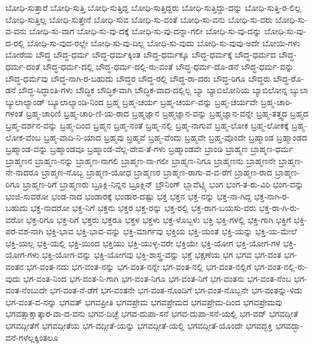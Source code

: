 {ಬೋಧಿ-ಸುತ್ತಾರೆ
ಬೋಧಿ-ಸುತ್ತಿ
ಬೋಧಿ-ಸುತ್ತಿದ್ದ
ಬೋಧಿ-ಸುತ್ತಿದ್ದರು
ಬೋಧಿ-ಸುತ್ತಿದ್ದು-ದನ್ನು
ಬೋಧಿ-ಸುತ್ತಿ-ರ-ಲಿಲ್ಲ
ಬೋಧಿ-ಸುತ್ತಿಲ್ಲ
ಬೋಧಿ-ಸುತ್ತೇನೆ
ಬೋಧಿ-ಸುವ
ಬೋಧಿ-ಸು-ವಂತೆ
ಬೋಧಿ-ಸು-ವನು
ಬೋಧಿ-ಸು-ವರು
ಬೋಧಿ-ಸು-ವ-ವನು
ಬೋಧಿ-ಸು-ವಾಗ
ಬೋಧಿ-ಸು-ವು-ದಕ್ಕೆ
ಬೋಧಿ-ಸು-ವು-ದನ್ನಾ-ಗಲೀ
ಬೋಧಿ-ಸು-ವು-ದನ್ನು
ಬೋಧಿ-ಸು-ವು-ದ-ರಲ್ಲಿ
ಬೋಧಿ-ಸು-ವುದ-ರಲ್ಲೇ
ಬೋಧಿ-ಸು-ವು-ದಿಲ್ಲ
ಬೋಧಿ-ಸು-ವುದು
ಬೋಧಿ-ಸು-ವುವು-ಅದೇ
ಬೋಯಿ-ಗಳು
ಬೋರೆಯ
ಬೌದ್ಧ
ಬೌದ್ಧ-ಧರ್ಮ
ಬೌದ್ಧ-ಧರ್ಮಕ್ಕಿಂತ
ಬೌದ್ಧ-ಧರ್ಮಕ್ಕೂ
ಬೌದ್ಧ-ಧರ್ಮಕ್ಕೆ
ಬೌದ್ಧ-ಧರ್ಮದ
ಬೌದ್ಧ-ಧರ್ಮ-ದಂತೆ
ಬೌದ್ಧ-ಧರ್ಮ-ದಲ್ಲಿ
ಬೌದ್ಧ-ಧರ್ಮ-ದಲ್ಲಿ-ರು-ವಂತೆ
ಬೌದ್ಧ-ಧರ್ಮ-ದೊ-ಡನೆ
ಬೌದ್ಧ-ಧರ್ಮ-ವನ್ನು
ಬೌದ್ಧ-ಧರ್ಮವು
ಬೌದ್ಧ-ನಾಗಿ-ರ-ಬಹುದು
ಬೌದ್ಧರ
ಬೌದ್ಧ-ರಲ್ಲಿ
ಬೌದ್ಧ-ರಾ-ದರು
ಬೌದ್ಧ-ರಿಗೂ
ಬೌದ್ಧರು
ಬೌದ್ಧ-ರೊ-ಡನೆ
ಬೌದ್ಧ-ಸಿದ್ಧಾಂತಿ-ಗಳು
ಬೌದ್ಧಿಕ
ಬೌದ್ಧಿಕ-ವಾಗಿ
ಬೌದ್ಧಿಕ-ವಾದ-ದಲ್ಲಿಲ್ಲ
ಬ್ಯಾ
ಬ್ಯಾಬಿಲೋನಿಯ
ಬ್ಯಾಬಿಲೋನ್ನ
ಬ್ಯುಲಾ
ಬ್ಯುಲಾಲ್ಯಾಂಡ್
ಬ್ಯೂಲಾಲ್ಯಾಂಡಿ-ನಿಂದ
ಬ್ರಹ್ಮ
ಬ್ರಹ್ಮ-ಚರ್ಯ
ಬ್ರಹ್ಮ-ಚರ್ಯ-ವನ್ನು
ಬ್ರಹ್ಮ-ಚರ್ಯವೇ
ಬ್ರಹ್ಮ-ಚಾರಿ-ಗಳಂತೆ
ಬ್ರಹ್ಮ-ಚಾರಿಣಿ
ಬ್ರಹ್ಮ-ಚಾರಿ-ಣಿ-ಯ-ರಾದ
ಬ್ರಹ್ಮಜ್ಞಾನ
ಬ್ರಹ್ಮಜ್ಞಾನ-ವನ್ನು
ಬ್ರಹ್ಮಜ್ಞಾನ-ವನ್ನೇ
ಬ್ರಹ್ಮ-ತತ್ತ್ವದ
ಬ್ರಹ್ಮದ
ಬ್ರಹ್ಮ-ದರ್ಶನ-ವನ್ನು
ಬ್ರಹ್ಮ-ದಿಂದ
ಬ್ರಹ್ಮನ
ಬ್ರಹ್ಮ-ನಂತೆ
ಬ್ರಹ್ಮ-ನಲ್ಲಿ
ಬ್ರಹ್ಮ-ನಾಗುವೆ
ಬ್ರಹ್ಮ-ಲೋಕ
ಬ್ರಹ್ಮ-ಲೋಕಕ್ಕೆ
ಬ್ರಹ್ಮ-ಲೋಕ-ವೆಂಬ
ಬ್ರಹ್ಮ-ವಾದಿ-ನಿ-ಯಾದ
ಬ್ರಹ್ಮವು
ಬ್ರಹ್ಮವೆ
ಬ್ರಹ್ಮ-ವೆಂದು
ಬ್ರಹ್ಮವೇ
ಬ್ರಹ್ಮ-ವೊಂದೇ
ಬ್ರಹ್ಮಾಂಡ
ಬ್ರಹ್ಮಾಂಡದ
ಬ್ರಹ್ಮಾಂಡ-ವನ್ನು
ಬ್ರಹ್ಮಾಂಡವೂ
ಬ್ರಹ್ಮಾಂಡ-ವೆಲ್ಲ-ದೇವ-ತೆ-ಗಳು
ಬ್ರಹ್ಮಾಂಡವೇ
ಬ್ರಾಂಡಿ
ಬ್ರಾಹ್ಮಣ
ಬ್ರಾಹ್ಮಣ-ಧರ್ಮ
ಬ್ರಾಹ್ಮಣನ
ಬ್ರಾಹ್ಮಣ-ನನ್ನು
ಬ್ರಾಹ್ಮಣ-ನಾಗಲಿ
ಬ್ರಾಹ್ಮಣ-ನಾ-ಗಲೀ
ಬ್ರಾಹ್ಮಣ-ನಿಗೂ
ಬ್ರಾಹ್ಮಣನು
ಬ್ರಾಹ್ಮಣನೇ
ಬ್ರಾಹ್ಮಣ-ನೇ-ನಾದರೂ
ಬ್ರಾಹ್ಮಣ-ನೊಬ್ಬ
ಬ್ರಾಹ್ಮಣ-ಯೋಧ
ಬ್ರಾಹ್ಮಣರ
ಬ್ರಾಹ್ಮಣ-ರಾಗು-ವ-ವ-ರೆಗೆ
ಬ್ರಾಹ್ಮಣ-ರಾದ
ಬ್ರಾಹ್ಮಣ-ರಿಗೂ
ಬ್ರಾಹ್ಮಣ-ರಿಗೆ
ಬ್ರಾಹ್ಮಣರು
ಬ್ರೂಕ್ಲಿ-ನಿನ್ನನ
ಬ್ರೂಕ್ಲಿನ್
ಬ್ರೌನಿಂಗ್
ಬ್ಲಾವೆಟ್ಸ್ಕಿ
ಭಂಗ
ಭಂಗ-ತ-ರು-ವಿರಿ
ಭಂಗ-ವನ್ನು
ಭಂಜಿ-ಸುವರೋ
ಭಂಡ-ನಾದ
ಭಂಡಾರಕ್ಕೆ
ಭಂಡಾರ-ದಷ್ಟು
ಭಕ್ತ
ಭಕ್ತನ
ಭಕ್ತ-ನನ್ನು
ಭಕ್ತ-ನಾ-ಗಿದ್ದ
ಭಕ್ತ-ನಾಗಿ-ರ-ಬಹುದು
ಭಕ್ತ-ನಾದರೋ
ಭಕ್ತ-ನಿಗೆ
ಭಕ್ತನು
ಭಕ್ತರ
ಭಕ್ತ-ರನ್ನು
ಭಕ್ತ-ರಲ್ಲಿ
ಭಕ್ತ-ರಾಗ-ಬಯಸು-ವರು
ಭಕ್ತ-ರಾ-ಗಿ-ರು-ವರೋ
ಭಕ್ತ-ರಿಗೂ
ಭಕ್ತ-ರಿಗೆ
ಭಕ್ತರು
ಭಕ್ತರೂ
ಭಕ್ತಳ
ಭಕ್ತಳು
ಭಕ್ತ-ಳೊಬ್ಬಳು
ಭಕ್ತಿ
ಭಕ್ತಿ-ಗಳಲ್ಲಿ
ಭಕ್ತಿ-ಗಾಗಿ
ಭಕ್ತಿಗೆ
ಭಕ್ತಿ-ಪರ-ವಶ-ನಾಗಿ
ಭಕ್ತಿ-ಭಾವ
ಭಕ್ತಿ-ಭಾವ-ವನ್ನು
ಭಕ್ತಿ-ಮಾರ್ಗವು
ಭಕ್ತಿಯ
ಭಕ್ತಿ-ಯಂತೆ
ಭಕ್ತಿ-ಯನ್ನು
ಭಕ್ತಿ-ಯ-ಮೇಲೆ
ಭಕ್ತಿ-ಯಲ್ಲ
ಭಕ್ತಿ-ಯಲ್ಲಿ
ಭಕ್ತಿ-ಯಿಂದ
ಭಕ್ತಿಯು
ಭಕ್ತಿ-ಯುಳ್ಳ-ವರೇ
ಭಕ್ತಿಯೇ
ಭಕ್ತಿ-ಯೋಗ
ಭಕ್ತಿ-ಯೋಗ-ಗಳ
ಭಕ್ತಿ-ಯೋಗ-ಗಳು
ಭಕ್ತಿ-ಯೋಗ-ವನ್ನು
ಭಕ್ತಿ-ಯೋಗವು
ಭಕ್ತಿ-ಶಾಸ್ತ್ರ-ವನ್ನು
ಭಕ್ತೆ
ಭಕ್ಷಣೆಯ
ಭಗ
ಭಗವ
ಭಗ-ವಂತ
ಭಗ-ವಂತನ
ಭಗ-ವಂತ-ನದು
ಭಗ-ವಂತ-ನನ್ನು
ಭಗ-ವಂತ-ನನ್ನೇ
ಭಗ-ವಂತ-ನಲ್ಲಿ
ಭಗ-ವಂತ-ನಲ್ಲಿಗೆ
ಭಗ-ವಂತ-ನಲ್ಲಿ-ರು-ವುದು
ಭಗ-ವಂತ-ನಿಂದ
ಭಗ-ವಂತ-ನಿ-ಗಾಗಿ
ಭಗ-ವಂತ-ನಿಗೂ
ಭಗ-ವಂತ-ನಿಗೆ
ಭಗ-ವಂತನು
ಭಗ-ವಂತ-ನೆಂಬ
ಭಗ-ವಂತ-ನೆಂಬುದೇ
ಭಗ-ವಂತ-ನೆ-ಡೆಗೆ
ಭಗ-ವಂತನೇ
ಭಗ-ವಂತ-ನೊಂದಿಗೆ
ಭಗ-ವಂತ-ನೊಬ್ಬನೇ
ಭಗ-ವಂತನ್ನು-ಳಿದು
ಭಗ-ವಂತ-ವ-ನನ್ನು
ಭಗವತ್
ಭಗವಪ್ರೀತಿ
ಭಗವಪ್ರೇಮ
ಭಗವಪ್ರೇಮದ
ಭಗವಪ್ರೇಮ-ದಿಂದ
ಭಗವಪ್ರೇಮವು
ಭಗವತ್ಸಾಕ್ಷಾತ್ಕಾರ-ವಾ-ದ-ವನು
ಭಗವ-ದಿಚ್ಛೆ
ಭಗವ-ದುಪಾ-ಸನೆ
ಭಗವ-ದುಪಾ-ಸನೆ-ಯಲ್ಲಿ
ಭಗ-ವದ್
ಭಗವದ್ಗೀತೆ
ಭಗವದ್ಗೀತೆಗೆ
ಭಗವದ್ಗೀತೆಯ
ಭಗ-ವದ್ಗೀತೆ-ಯನ್ನು
ಭಗವದ್ಗೀತೆ-ಯಲ್ಲಿ
ಭಗವದ್ಗೀತೆ-ಯೊಂದೇ
ಭಗವದ್ಭಕ್ತಿ
ಭಗವದ್ಭಾ-ವನೆ-ಗಳೆಲ್ಲಕ್ಕಿಂತಲೂ
}

